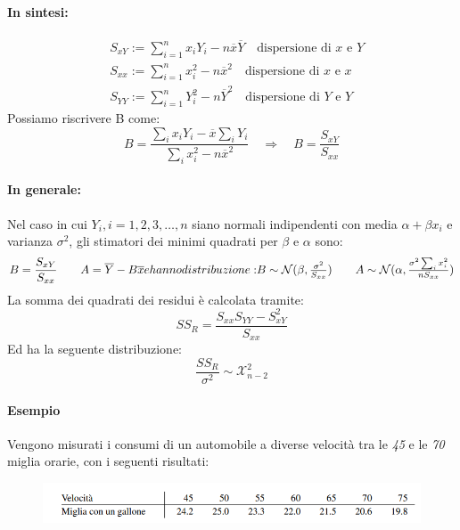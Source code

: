 \documentclass[]{article}
\begin{document}
    \paragraph{In sintesi:}
    \begin{equation*}
        \begin{split}
            &S_{xY} := \sum_{i=1}^n x_i Y_i - n \overline x \overline Y \quad \text{dispersione di $x$ e $Y$}\\
            &S_{xx} := \sum_{i = 1}^{n} x^2_i - n \overline x^2 \quad \text{dispersione di $x$ e $x$}\\
            &S_{YY} := \sum_{i=1}^{n} Y_i^2 - n \overline Y^2 \quad \text{dispersione di $Y$ e $Y$}
        \end{split}
    \end{equation*}
    Possiamo riscrivere B come:
    \[ B = \frac{\sum_ix_iY_i - \overline{x}\sum_i Y_i }{\sum_i x_i^2 - n \overline x^2} \quad \Rightarrow \quad B=\frac{S_{xY}}{S_{xx}}\]
    \paragraph{In generale:}
    Nel caso in cui $Y_i, i = 1,2,3,\ldots,n$  siano normali indipendenti con media $\alpha + \beta x_i$ e varianza $\sigma^2$, gli stimatori dei minimi quadrati per $\beta$ e $\alpha$ sono:
    \[ B = \frac{S_{xY}}{S_{xx}} \quad \quad A = \overline Y - B \overline x $$ e hanno distribuzione: $$ B \sim \mathcal N(\beta,\frac{\sigma^2}{S_{xx}}) \quad \quad A \sim \mathcal N(\alpha,\frac{\sigma^2 \sum_ix_i^2}{nS_{xx}}) \]
    La somma dei quadrati dei residui è calcolata tramite:
    \[ SS_R = \frac{S_{xx}S_{YY}- S_{xY}^2}{S_{xx}} \]
    Ed ha la seguente distribuzione:
    \[ \frac{SS_R}{\sigma^2} \sim \mathcal X^2_{n-2} \]
    \paragraph{Esempio} Vengono misurati i consumi di un automobile a diverse velocità tra le \textit{45} e le \textit{70} miglia orarie, con i seguenti risultati:
    \begin{figure}[H]
        \includegraphics[width=\textwidth]{images/boh_18.png}
    \end{figure}
\end{document}
